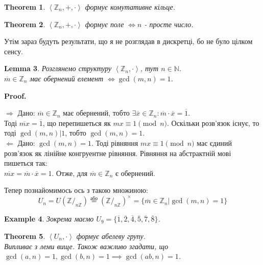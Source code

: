 \documentclass[a4paper, 10pt]{article}
\makeatletter
\theoremstyle{theoremdd}
\newtheorem{theorem}{Theorem}[subsection]
\theoremstyle{theoremdd}
\theoremstyle{theoremdd}
\theoremstyle{theoremdd}
\newtheorem{example}[theorem]{Example}
\theoremstyle{theoremdd}
\theoremstyle{theoremdd}
\theoremstyle{theoremdd}
\newtheorem{lemma}[theorem]{Lemma}
\theoremstyle{theoremdd}
\def\rightproof{$\boxed{\Rightarrow}$ }
\def\leftproof{$\boxed{\Leftarrow}$ }
\renewenvironment{proof}[1][Proof.\\]{\par
\pushQED{\hfill \qed}%
\normalfont \topsep6\p@\@plus6\p@\relax
\trivlist
\item\relax
{\bfseries
#1\@addpunct{.}}\hspace\labelsep\ignorespaces
}{%
\popQED\endtrivlist\@endpefalse
}
\makeatother
\begin{document}
\begin{theorem}
$\left< \mathbb{Z}_n, +, \cdot \right>$ формує комутативне кільце.
\end{theorem}

\begin{theorem}
$\left< \mathbb{Z}_n, +, \cdot \right>$ формує поле $\iff n$ - просте число.
\end{theorem}

Утім зараз будуть результати, що я не розглядав в дискретці, бо не було цілком сенсу.
\begin{lemma}
Розглянемо структуру $\left< \mathbb{Z}_n, \cdot \right>$, тут $n \in \mathbb{N}$.\\
$\overline{m} \in \mathbb{Z}_n$ має обернений елемент $\iff \gcd(m,n) = 1$.
\end{lemma}

\begin{proof}
\rightproof Дано: $\overline{m} \in \mathbb{Z}_n$ має обернений, тобто $\exists \overline{x} \in \mathbb{Z}_n: \overline{m} \cdot \overline{x} = \overline{1}$.\\
Тоді $\overline{mx} = \overline{1}$, що перепишеться як $mx \equiv 1 \pmod n$. Оскільки розв'язок існує, то тоді $\gcd(m,n) | 1$, тобто $\gcd(m,n) = 1$.
\bigskip \\
\leftproof Дано: $\gcd(m,n) = 1$. Тоді рівняння $mx \equiv 1 \pmod n$ має єдиний розв'язок як лінійне конгруентне рівняння. Рівняння на абстрактній мові пишеться так:\\
$\overline{mx} = \overline{m} \cdot \overline{x} = 1$. Отже, для $\overline{m} \in \mathbb{Z}_n$ є обернений.
\end{proof}

Тепер познайомимось ось з такою множиною:
$$ U_n = U(\mathbb{Z}/_{n \mathbb{Z}}) \overset{\text{або}}{=} (\mathbb{Z}/_{n\mathbb{Z}})^\times = \{\overline{m} \in \mathbb{Z}_n | \gcd(m,n) = 1\} $$
\begin{example}
Зокрема маємо $U_9 = \{\overline{1}, \overline{2}, \overline{4}, \overline{5}, \overline{7}, \overline{8} \}$.
\end{example}

\begin{theorem}
$\left< U_n, \cdot \right>$ формує абелеву групу.\\
\textit{Випливає з леми вище. Також важливо згадати, що \\
$\gcd(a,n) = 1, \gcd(b,n)= 1 \implies \gcd(ab,n) = 1$.}
\end{theorem}
\end{document}
